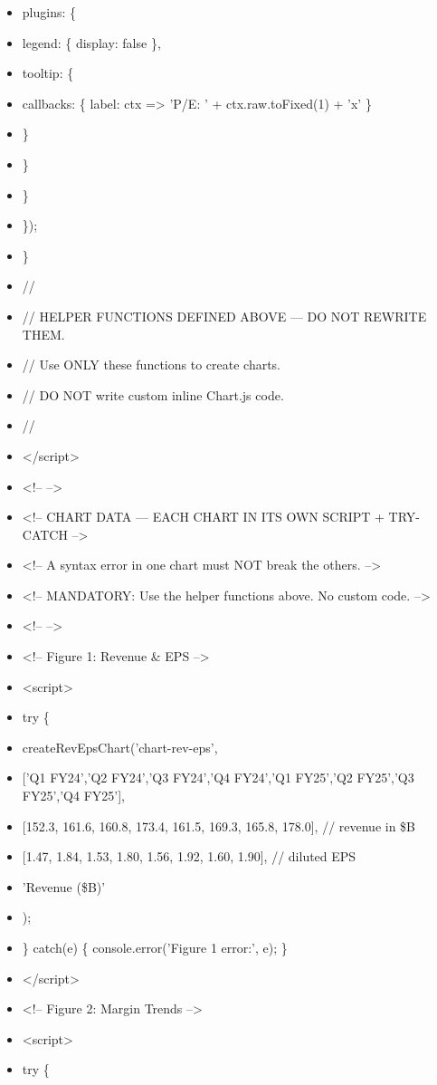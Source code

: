\documentclass[11pt]{article}
\begin{document}
\begin{itemize}[leftmargin=*,itemsep=2pt,topsep=2pt]
\item {} plugins: \{
\item {} legend: \{ display: false \},
\item {} tooltip: \{
\item {} callbacks: \{ label: ctx => 'P/E: ' + ctx.raw.toFixed(1) + 'x' \}
\item {} \}
\item {} \}
\item {} \}
\item {} \});
\item {} \}
\item {} //
\item {} // HELPER FUNCTIONS DEFINED ABOVE — DO NOT REWRITE THEM.
\item {} // Use ONLY these functions to create charts.
\item {} // DO NOT write custom inline Chart.js code.
\item {} //
\item {} </script>
\item {} <!-- -->
\item {} <!-- CHART DATA — EACH CHART IN ITS OWN SCRIPT + TRY-CATCH -->
\item {} <!-- A syntax error in one chart must NOT break the others. -->
\item {} <!-- MANDATORY: Use the helper functions above. No custom code. -->
\item {} <!-- -->
\item {} <!-- Figure 1: Revenue \& EPS -->
\item {} <script>
\item {} try \{
\item {} createRevEpsChart('chart-rev-eps',
\item {} ['Q1 FY24','Q2 FY24','Q3 FY24','Q4 FY24','Q1 FY25','Q2 FY25','Q3 FY25','Q4 FY25'],
\item {} [152.3, 161.6, 160.8, 173.4, 161.5, 169.3, 165.8, 178.0], // revenue in \$B
\item {} [1.47, 1.84, 1.53, 1.80, 1.56, 1.92, 1.60, 1.90], // diluted EPS
\item {} 'Revenue (\$B)'
\item {} );
\item {} \} catch(e) \{ console.error('Figure 1 error:', e); \}
\item {} </script>
\item {} <!-- Figure 2: Margin Trends -->
\item {} <script>
\item {} try \{

\end{itemize}
\end{document}
